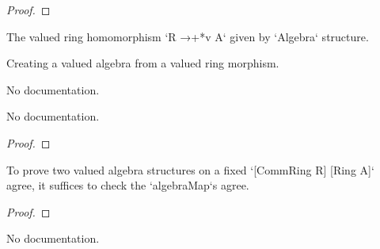 \begin{proof}
    \leanok
\end{proof}

\begin{definition}\label{valAlgebraMap}
        \leanok
                The valued ring homomorphism `R →+*v A` given by `Algebra` structure.
    \end{definition}

\begin{definition}\label{ValRingHom.toValAlgebra'}
        \leanok
                Creating a valued algebra from a valued ring morphism.
    \end{definition}

\begin{definition}\label{ValRingHom.toValAlgebra}
        \leanok
                No documentation.
    \end{definition}

\begin{theorem}\label{ValRingHom.valAlgebraMap_toValAlgebra}
        \leanok
                No documentation.
    \end{theorem}

\begin{proof}
    \leanok
\end{proof}

\begin{theorem}\label{ValAlgebra.valAlgebra_ext}
        \leanok
                To prove two valued algebra structures on a fixed `[CommRing R] [Ring A]` agree,
it suffices to check the `algebraMap`s agree.
    \end{theorem}

\begin{proof}
    \leanok
\end{proof}

\begin{theorem}\label{ValAlgebra.val_isEquiv_comap}
        \leanok
                No documentation.
    \end{theorem}

